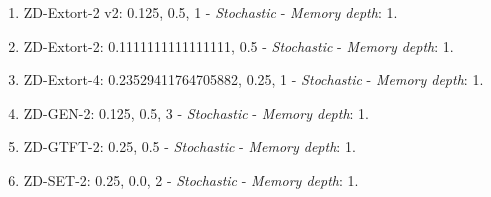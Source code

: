 \documentclass[10pt,letterpaper]{article}
\begin{document}
\begin{enumerate}
\item ZD-Extort-2 v2: 0.125, 0.5, 1 - \textit{Stochastic} - \textit{Memory depth}: 1. \cite{Kuhn2017}
\item ZD-Extort-2: 0.1111111111111111, 0.5 - \textit{Stochastic} - \textit{Memory depth}: 1. \cite{Stewart2012}
\item ZD-Extort-4: 0.23529411764705882, 0.25, 1 - \textit{Stochastic} - \textit{Memory depth}: 1. \cite{axelrodproject}
\item ZD-GEN-2: 0.125, 0.5, 3 - \textit{Stochastic} - \textit{Memory depth}: 1. \cite{Kuhn2017}
\item ZD-GTFT-2: 0.25, 0.5 - \textit{Stochastic} - \textit{Memory depth}: 1. \cite{Stewart2012}
\item ZD-SET-2: 0.25, 0.0, 2 - \textit{Stochastic} - \textit{Memory depth}: 1. \cite{Kuhn2017}
\end{enumerate}
\end{document}
